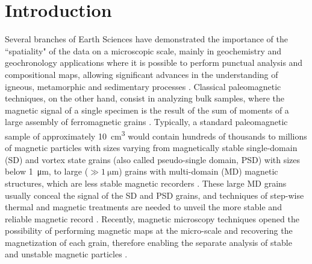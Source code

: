 \section{Introduction}

Several branches of Earth Sciences have demonstrated the importance of the
``spatiality" of the data on a microscopic scale, mainly in geochemistry and
geochronology applications where it is possible to perform punctual analysis
and compositional maps, allowing significant advances in the understanding of
igneous, metamorphic and sedimentary processes \citep{Verberne2020, Barnes2019,
Davidson2007}. Classical paleomagnetic techniques, on the other hand, consist
in analyzing bulk samples, where the magnetic signal of a single specimen is
the result of the sum of moments of a large assembly of ferromagnetic grains
\citep{Dunlop1997}. Typically, a standard paleomagnetic sample of
approximately \qty{10}{\cm\cubed} would contain hundreds of thousands
to millions of magnetic particles with sizes varying from magnetically stable
single-domain (SD) and vortex state grains (also called pseudo-single domain,
PSD) with sizes below \qty{1}{\um}, to large ($\gg \qty{1}{\um}$) grains with
multi-domain (MD) magnetic structures, which are less stable magnetic recorders
\citep{Berndt2016}. These large MD grains usually conceal the signal of the SD
and PSD grains, and techniques of step-wise thermal and magnetic treatments are
needed to unveil the more stable and reliable magnetic record
\citep{Tauxe2018}. Recently, magnetic microscopy techniques opened the
possibility of performing magnetic maps at the micro-scale and recovering the
magnetization of each grain, therefore enabling the separate analysis of stable
and unstable magnetic particles \citep{DeGroot2018, Lima2014, Weiss2007,
DeGroot2014}.

